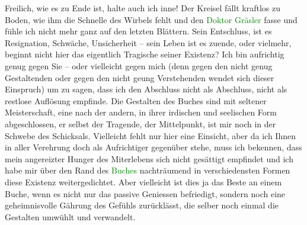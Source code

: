 \pstart
           Freilich, wie es zu Ende ist, halte auch ich inne! Der Kreisel fällt kraftlos zu
               Boden, wie ihm die Schnelle des Wirbels fehlt und den \textcolor{green}{Doktor Gräsler}{}\ledrightnote{{$\rightarrow$}\textcolor{green}{Doktor Gräsler, Badearzt}} fasse und fühle ich nicht mehr ganz auf den
               letzten Blättern. Sein Entschluss, ist es Resignation, Schwäche, Unsicherheit – sein
               Leben ist es zuende, oder vielmehr, beginnt nicht hier das eigentlich Tragische
               seiner Existenz? Ich bin aufrichtig genug gegen Sie – oder vielleicht gegen mich
               (denn gegen den nicht genug Gestaltenden oder gegen den nicht geung Verstehenden
               wendet sich dieser Einspruch) um zu sagen, dass ich den Abschluss nicht als
               Abschluss, nicht als restlose Auflösung empfinde. Die Gestalten des Buches sind mit
               seltener Meisterschaft, eine nach der andern, in ihrer irdischen und seelischen Form
               abgeschlossen, {\pb}er selbst der Tragende,
               der Mittelpunkt, ist mir noch in der Schwebe des Schicksals. Vielleicht fehlt nur
               hier eine Einsicht, aber da ich Ihnen in aller Verehrung doch als Aufrichtiger
               gegenüber stehe, muss ich bekennen, dass mein angereizter Hunger des Miterlebens sich
               nicht gesättigt empfindet und ich habe mir über den Rand des \textcolor{green}{Buches}{}\ledrightnote{{$\rightarrow$}\textcolor{green}{Doktor Gräsler, Badearzt}} nachträumend in verschiedensten
               Formen diese Existenz weitergedichtet. Aber vielleicht ist dies ja das Beste an einem
               Buche, wenn es nicht nur das passive Geniessen befriedigt, sondern noch eine
               geheimnisvolle Gährung des Gefühls zurücklässt, die selber noch einmal die Gestalten
               umwühlt und verwandelt.\pend
           
